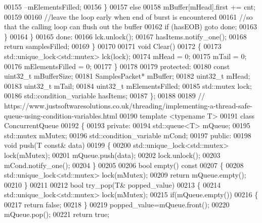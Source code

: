 \begin{DoxyCode}
00155                     --mElementsFilled;
00156                 \}
00157                 \textcolor{keywordflow}{else}
00158                     mBuffer[mHead].first += cnt;
00159 
00160                 \textcolor{comment}{//leave the loop early when end of burst is encountered}
00161                 \textcolor{comment}{//so that the calling loop can flush out the buffer}
00162                 \textcolor{keywordflow}{if} (hasEOB) \textcolor{keywordflow}{goto} done;
00163             \}
00164         \}
00165         done:
00166         lck.unlock();
00167         hasItems.notify\_one();
00168         \textcolor{keywordflow}{return} samplesFilled;
00169     \}
00170 
00171     \textcolor{keywordtype}{void} Clear()
00172     \{
00173         std::unique\_lock<std::mutex> lck(lock);
00174         mHead = 0;
00175         mTail = 0;
00176         mElementsFilled = 0;
00177     \}
00178 
00179 \textcolor{keyword}{protected}:
00180     \textcolor{keyword}{const} uint32\_t mBufferSize;
00181     SamplesPacket* mBuffer;
00182     uint32\_t mHead;
00183     uint32\_t mTail;
00184     uint32\_t mElementsFilled;
00185     std::mutex lock;
00186     std::condition\_variable hasItems;
00187 \};
00188 
00189 \textcolor{comment}{//
      https://www.justsoftwaresolutions.co.uk/threading/implementing-a-thread-safe-queue-using-condition-variables.html}
00190 \textcolor{keyword}{template} <\textcolor{keyword}{typename} T>
00191 \textcolor{keyword}{class }ConcurrentQueue
00192 \{
00193 \textcolor{keyword}{private}:
00194     std::queue<T> mQueue;
00195     std::mutex mMutex;
00196     std::condition\_variable mCond;
00197 \textcolor{keyword}{public}:
00198     \textcolor{keywordtype}{void} push(T \textcolor{keyword}{const}& data)
00199     \{
00200         std::unique\_lock<std::mutex> lock(mMutex);
00201         mQueue.push(data);
00202         lock.unlock();
00203         mCond.notify\_one();
00204     \}
00205 
00206     \textcolor{keywordtype}{bool} empty()\textcolor{keyword}{ const}
00207 \textcolor{keyword}{    }\{
00208         std::unique\_lock<std::mutex> lock(mMutex);
00209         \textcolor{keywordflow}{return} mQueue.empty();
00210     \}
00211 
00212     \textcolor{keywordtype}{bool} try_pop(T& popped\_value)
00213     \{
00214         std::unique\_lock<std::mutex> lock(mMutex);
00215         \textcolor{keywordflow}{if}(mQueue.empty())
00216         \{
00217             \textcolor{keywordflow}{return} \textcolor{keyword}{false};
00218         \}
00219         popped\_value=mQueue.front();
00220         mQueue.pop();
00221         \textcolor{keywordflow}{return} \textcolor{keyword}{true};

\end{DoxyCode}
